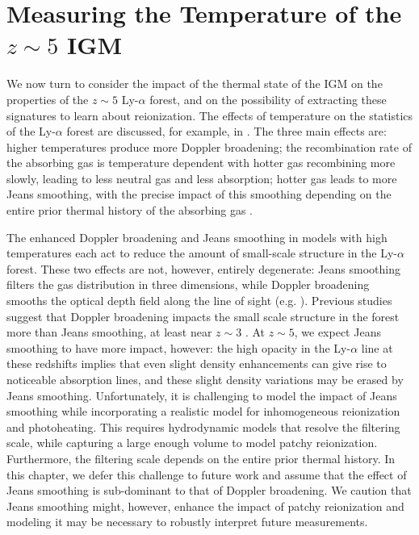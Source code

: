 \section{Measuring the Temperature of the $z \sim 5$ IGM}
\label{sec:IGMTemptemp_measure}

We now turn to consider the impact of the thermal state of the IGM on the properties of the $z \sim 5$ Ly-$\alpha$ 
forest, and
on the possibility of extracting these signatures to learn about reionization. The effects of temperature
on the statistics of the Ly-$\alpha$ forest are discussed, for example, in \citet{Lidz:2009ca}. The three main effects 
are: higher temperatures produce more Doppler broadening; the recombination rate of the absorbing gas is temperature
dependent with hotter gas recombining more slowly, leading to less neutral gas and less absorption; hotter gas leads
to more Jeans smoothing, with the precise impact of this smoothing depending on the entire prior thermal history of the absorbing gas
\citep{Gnedin:1997td}. 

The enhanced Doppler broadening and Jeans smoothing in models with high temperatures each act to reduce the amount of small-scale structure in the Ly-$\alpha$ forest.
These two effects are not, however, entirely degenerate: Jeans smoothing filters the gas distribution in three dimensions, while
Doppler broadening smooths the optical depth field along the line of sight 
(e.g. \citealt{Zaldarriaga:2000mz}). Previous studies suggest that Doppler broadening impacts the small scale structure in the
forest more than Jeans smoothing, at least near $z \sim 3$ \citep{Zaldarriaga:2000mz,Peeples:2009ue,Lidz:2009ca}. At $z \sim 5$, we 
expect Jeans smoothing to have more impact, however: the high opacity in the Ly-$\alpha$ line at these redshifts implies that even slight
density enhancements can give rise to noticeable absorption lines, and these slight density variations may be erased by Jeans
smoothing. Unfortunately, it is challenging to model the impact of Jeans smoothing while incorporating a realistic model
for inhomogeneous reionization and photoheating. This requires hydrodynamic models that resolve the filtering scale, while capturing
a large enough volume to model patchy reionization. Furthermore, the filtering scale depends on the entire prior thermal history. 
In this chapter, we defer this challenge to future work and assume that the effect of Jeans smoothing is sub-dominant
to that of Doppler broadening. We caution that Jeans smoothing might, however, enhance the impact of patchy reionization and 
modeling it may be necessary to robustly interpret future measurements. 

